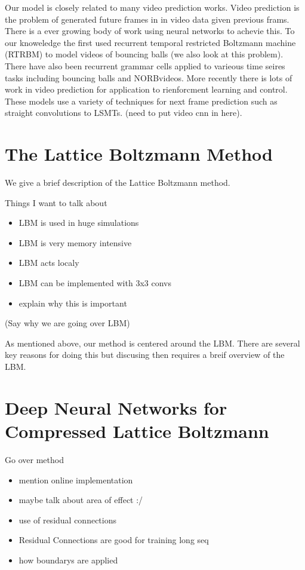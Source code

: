 \documentclass{article}
\begin{document}
Our model is closely related to many video prediction works. Video prediction is the problem of generated future frames in in video data given previous frams. There is a ever growing body of work using neural networks to achevie this. To our knoweledge the first used recurrent temporal restricted Boltzmann machine (RTRBM) to model videos of bouncing balls (we also look at this problem). There have also been recurrent grammar cells applied to varieous time seires tasks including bouncing balls and NORBvideos. More recently there is lots of work in video prediction for application to rienforcment learning and control. These models use a variety of techniques for next frame prediction such as straight convolutions  to LSMTs. (need to put video cnn in here).

\section{The Lattice Boltzmann Method}

We give a brief description of the Lattice Boltzmann method.

Things I want to talk about

\begin{itemize}
  \item LBM is used in huge simulations
  \item LBM is very memory intensive
  \item LBM acts localy
  \item LBM can be implemented with 3x3 convs
  \item explain why this is important
\end{itemize}

(Say why we are going over LBM)

As mentioned above, our method is centered around the LBM. There are several key reasons for doing this but discusing then requires a breif overview of the LBM. 




\section{Deep Neural Networks for Compressed Lattice Boltzmann}

Go over method
\begin{itemize}
  \item mention online implementation
  \item maybe talk about area of effect :/
  \item use of residual connections
  \item Residual Connections are good for training long seq
  \item how boundarys are applied
\end{itemize}
\end{document}
